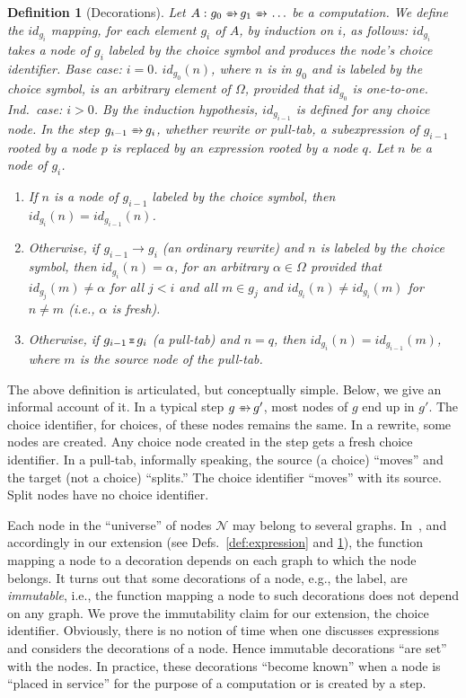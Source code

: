 \documentclass{mytlp}
\newcommand{\inparen}[1]{\mbox{\rm (}#1\mbox{\rm )}}
\newcommand{\nodes}{\ensuremath{\mathcal{N}}}
\newtheorem{definition}{Definition}
\newcommand{\pulltab}{\mbox{\raisebox{.15ex}[0pt][0pt]{\tiny$\Xi$}}}
\newcommand{\toxi}{
  \mbox{$\rlap{\raisebox{.15ex}[0pt][0pt]{\kern.95ex\tiny$\Xi$}}\to\,$}
}
\begin{document}
\begin{definition}[Decorations]
\label{decorations}
Let $A: g_0 \toxi g_1 \toxi \ldots$ be a computation.
We define the $id_{g_i}$ mapping,
for each element $g_i$ of $A$,
by induction on $i$, as follows:
$id_{g_i}$ takes a node of $g_i$ labeled by the choice symbol
and produces the node's choice identifier.
Base case: $i=0$.  
$id_{g_0}(n)$, where $n$ is in $g_0$ and is labeled by the choice symbol,
is an arbitrary element of $\Omega$, provided that $id_{g_0}$ is one-to-one.
Ind.~case: $i>0$.  By the induction hypothesis, 
$id_{g_{i-1}}$ is defined for any choice node.
In the step $g_{i-1} \toxi g_i$, whether rewrite or pull-tab,
a subexpression of $g_{i-1}$
rooted by a node $p$ is replaced by an expression rooted by a node $q$. 
Let $n$ be a node of $g_i$.
\begin{enumerate}
\setlength{\itemsep}{-5pt}
\item If $n$ is a node of $g_{i-1}$ labeled by the choice symbol,
then $id_{g_i}(n) = id_{g_{i-1}}(n)$. \\[-1ex]
\item Otherwise, if $g_{i-1} \to g_i$ \inparen{an ordinary rewrite}
  and $n$ is labeled by the choice symbol,
  then $id_{g_i}(n) = \alpha$, for an arbitrary $\alpha \in \Omega$
  provided that $id_{g_j}(m) \ne \alpha$
  for all $j < i$ and all $m \in g_j$ and $id_{g_i}(n) \ne id_{g_i}(m)$
  for $n \ne m$ \inparen{i.e., $\alpha$ is fresh}. \\[-1ex]
\item Otherwise, if $g_{i-1} \,\pulltab\, g_i$ 
  \inparen{a pull-tab} and $n=q$,
  then $id_{g_i}(n)=id_{g_{i-1}}(m)$, 
  where $m$ is the source node of the pull-tab.
\end{enumerate}
\end{definition}
The above definition is articulated, but conceptually simple.
Below, we give an informal account of it.
In a typical step $g \toxi g'$, most nodes of $g$ end up in $g'$.
The choice identifier, for choices,
of these nodes remains the same.
In a rewrite, some nodes are created.
Any choice node created in the step
gets a fresh choice identifier.
In a pull-tab, informally speaking,
the source (a choice)  ``moves'' and the target (not a choice) ``splits.''
The choice identifier ``moves'' with its source.
Split nodes have no choice identifier.

Each node in the ``universe'' of nodes $\nodes$ may belong to
several graphs.  In~\cite{EchahedJanodet97IMAG},
and accordingly in our extension (see Defs.~\ref{def:expression}
and \ref{decorations}),
the function mapping a node to a decoration
depends on each graph to which the node belongs.
It turns out that some decorations of a node,
e.g., the label, are \emph{immutable},
i.e., the function mapping a node to such decorations
does not depend on any graph.
We prove the immutability claim
for our extension, the  choice identifier.
Obviously, there is no notion of time when one discusses
expressions and considers the decorations of a node.
Hence immutable decorations ``are set'' with the nodes.
In practice, these decorations ``become known''
when a node is ``placed in service'' for the purpose of a computation
or is created by a step.
\end{document}
